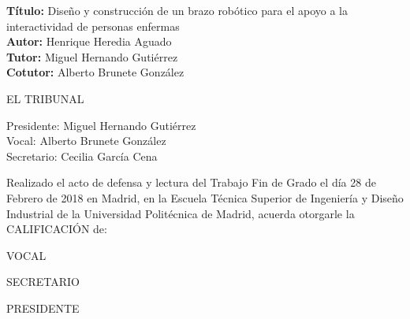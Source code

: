 \cleardoublepage

\begin{flushleft} \large
\textbf{Título:} Diseño y construcción de un brazo robótico para el apoyo a la interactividad de personas enfermas \\
\textbf{Autor:} Henrique Heredia Aguado\\
\textbf{Tutor:} Miguel Hernando Gutiérrez \\ 
\textbf{Cotutor:} Alberto Brunete González\\ [1 cm]

\end{flushleft} 

\begin{center} \LARGE
EL TRIBUNAL \\ [1 cm]
\end{center}

\begin{flushleft} \LARGE
Presidente: Miguel Hernando Gutiérrez \\ [1 cm]
Vocal: Alberto Brunete González \\ [1 cm]
Secretario: Cecilia García Cena \\ [1.5 cm]
\end{flushleft}

\large
Realizado el acto de defensa y lectura del Trabajo Fin de Grado el día 28 de Febrero de 2018 en Madrid, en la Escuela Técnica Superior de Ingeniería y Diseño Industrial de la Universidad Politécnica de Madrid, acuerda otorgarle la CALIFICACIÓN de: \\ [2 cm]

\begin{center}
 \large VOCAL \\ [2.2 cm]
\end{center}

\begin{minipage}{0.5\textwidth}
 \begin{flushleft}
 \large SECRETARIO
\end{flushleft}
\end{minipage}
\begin{minipage}{0.5\textwidth}
\begin{flushright}
 \large PRESIDENTE
\end{flushright} 
\end{minipage}